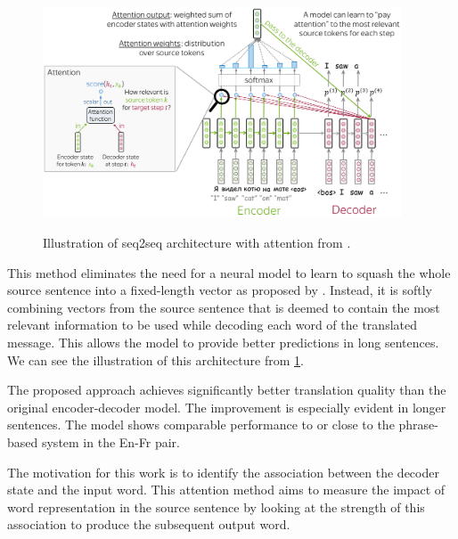 \begin{figure}[h]
    {\includegraphics[width=0.95\textwidth]{img/attseq2seq.png}}
    \centering
    \caption{Illustration of seq2seq architecture with attention from .}
    \label{img:attseq2seq}
\end{figure}

This method eliminates the need for a neural model to learn to squash the whole source sentence into a fixed-length vector as proposed by . Instead, it is softly combining vectors from the source sentence that is deemed to contain the most relevant information to be used while decoding each word of the translated message. This allows the model to provide better predictions in long sentences. We can see the illustration of this architecture from \cref{img:attseq2seq}.


The proposed approach achieves significantly better translation quality than the original encoder-decoder model. The improvement is especially evident in longer sentences. The model shows comparable performance to or close to the phrase-based system in the En-Fr pair.

The motivation for this work is to identify the association between the decoder state and the input word. This attention method aims to measure the impact of word representation in the source sentence by looking at the strength of this association to produce the subsequent output word.

